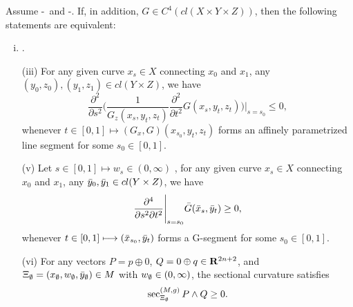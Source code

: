 \begin{theorem}\label{prop:4thorder2}
	Assume \Gzero-\Gtwo\ and \Gfour-\Geight. If, in addition, $G\in C^4(cl(X\times Y \times Z)
	)$,  then the following statements are equivalent:
	\begin{enumerate}[(i)]
		\item \Gthree.
				
		\item[(iii)] For any given curve $x_s\in X$ connecting $x_0$ and $x_1$,  any $(y_0, z_0),  (y_1, z_1) \in cl( Y \times Z) $, we have 
		\begin{equation}
		\frac{\partial^2}{\partial s^2 }\Biggl(\frac{1}{G_z(x_s, y_t, z_t)}\frac{\partial^2}{\partial t^2} G(x_s,y_t,z_t) \Biggr)\Bigg|_{s=s_0}\le 0,
		\end{equation}
		whenever $t\in [0,1] \longmapsto (G_x, G)(x_{s_0}, y_t, z_t)$  forms an affinely parametrized line segment for some $s_0\in [0,1]$.
		
	\item[(v)] Let $s\in [0,1] \longmapsto w_s \in (0, \infty)$
	, for any given curve $x_s\in X$ connecting $x_0$ and $x_1$, any $\bar{y}_0,  \bar{y}_1 \in cl( Y \times Z) $, we have 
	\begin{equation}\label{barG-4thorder}
	\frac{\partial^4}{\partial s^2 \partial t^2} \Bigg|_{s=s_0} \bar{G}(\bar{x}_s,\bar{y}_t)  \ge 0,
	\end{equation}
	whenever $t\in [0,1] \longmapsto (\bar{x}_{s_0}, \bar{y}_t)$  forms a G-segment for some $s_0\in [0,1]$.
	

	
	\item[(vi)] For any vectors $P = p \oplus 0$, $Q = 0 \oplus q \in {\mathbf R}^{2n+2}$, and $\Xi_{{\emptyset}} = (x_{{\emptyset}}, w_{{\emptyset}}, \bar{y}_{{\emptyset}}) \in M$ with $w_{{\emptyset}} \in (0, \infty)$, the sectional curvature satisfies
		\begin{equation}\label{Curvature_sectional2}
		\sec_{\Xi_{{\emptyset}}}^{(M, g)} P \wedge Q \ge 0.
		\end{equation}
	\end{enumerate} 
\end{theorem}

